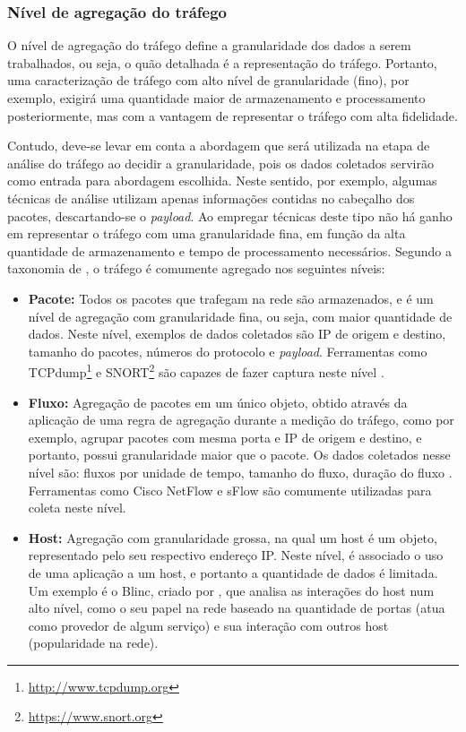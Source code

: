 \subsubsection{Nível de agregação do tráfego}
\label{cap2:agregacao_trafego}

O nível de agregação do tráfego define a granularidade dos dados a serem trabalhados, ou seja, o quão detalhada é a representação do tráfego.
%
Portanto, uma caracterização de tráfego com alto nível de granularidade (fino), por exemplo, exigirá uma quantidade maior de armazenamento e processamento posteriormente, mas com a vantagem de representar o tráfego com alta fidelidade.

Contudo, deve-se levar em conta a abordagem que será utilizada na etapa de análise do tráfego ao decidir a granularidade, pois os dados coletados servirão como entrada para abordagem escolhida.
%
Neste sentido, por exemplo, algumas técnicas de análise utilizam apenas informações contidas no cabeçalho dos pacotes, descartando-se o \textit{payload}.
%
Ao empregar técnicas deste tipo não há ganho em representar o tráfego com uma granularidade fina, em função da alta quantidade de armazenamento e tempo de processamento necessários.
%
Segundo a taxonomia de , o tráfego é comumente agregado nos seguintes níveis:

\begin{itemize}
	\item \textbf{Pacote:} Todos os pacotes que trafegam na rede são armazenados, e é um nível de agregação com granularidade fina, ou seja, com maior quantidade de dados.
	Neste nível, exemplos de dados coletados são IP de origem e destino, tamanho do pacotes, números do protocolo e \textit{payload}.
	Ferramentas como TCPdump\footnote{\url{http://www.tcpdump.org}} e SNORT\footnote{\url{https://www.snort.org}} são capazes de fazer captura neste nível \cite{callado:2009:survey}.
	
	\item \textbf{Fluxo:} Agregação de pacotes em um único objeto, obtido através da aplicação de uma regra de agregação durante a medição do tráfego, como por exemplo, agrupar pacotes com mesma porta e IP de origem e destino, e portanto, possui granularidade maior que o pacote.
	Os dados coletados nesse nível são: fluxos por unidade de tempo, tamanho do fluxo, duração do fluxo \cite{callado:2009:survey}. 
	Ferramentas como Cisco NetFlow e sFlow são comumente utilizadas para coleta neste nível.
	
	\item \textbf{Host:} Agregação com granularidade grossa, na qual um host é um objeto, representado pelo seu respectivo endereço IP.
	Neste nível, é associado o uso de uma aplicação a um host, e portanto a quantidade de dados é limitada.
	Um exemplo é o Blinc, criado por , que analisa as interações do host num alto nível, como o seu papel na rede baseado na quantidade de portas (atua como provedor de algum serviço) e sua interação com outros host (popularidade na rede).
\end{itemize}

